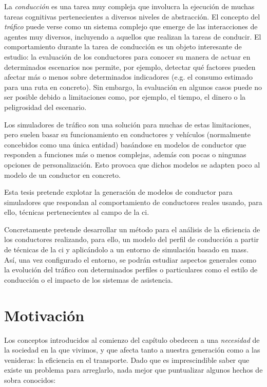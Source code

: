 La \textit{conducción} es una tarea muy compleja que involucra la ejecución de muchas tareas cognitivas pertenecientes a diversos niveles de abstracción. El concepto del \textit{tráfico} puede verse como un sistema complejo que emerge de las interacciones de agentes muy diversos, incluyendo a aquellos que realizan la tareas de conducir. El comportamiento durante la tarea de conducción es un objeto interesante de estudio: la evaluación de los conductores para conocer su manera de actuar en determinados escenarios nos permite, por ejemplo, detectar qué factores pueden afectar más o menos sobre determinados indicadores (e.g. el consumo estimado para una ruta en concreto). Sin embargo, la evaluación en algunos casos puede no ser posible debido a limitaciones como, por ejemplo, el tiempo, el dinero o la peligrosidad del escenario.

Los simuladores de tráfico son una solución para muchas de estas limitaciones, pero suelen basar su funcionamiento en conductores y vehículos (normalmente concebidos como una única entidad) basándose en modelos de conductor que responden a funciones más o menos complejas, además con pocas o ningunas opciones de personalización. Esto provoca que dichos modelos se adapten poco al modelo de un conductor en concreto.

Esta tesis pretende explotar la generación de modelos de conductor para simuladores que respondan al comportamiento de conductores reales usando, para ello, técnicas pertenecientes al campo de la \gls{ci}.

Concretamente pretende desarrollar un método para el análisis de la eficiencia de los conductores realizando, para ello, un modelo del perfil de conducción a partir de técnicas de la \gls{ci} y aplicándolo a un entorno de simulación basado en \glspl{mas}. Así, una vez configurado el entorno, se podrán estudiar aspectos generales como la evolución del tráfico con determinados perfiles o particulares como el estilo de conducción o el impacto de los sistemas de asistencia.

\section{Motivación}

Los conceptos introducidos al comienzo del capítulo obedecen a una \textit{necesidad} de la sociedad en la que vivimos, y que afecta tanto a nuestra generación como a las venideras: la eficiencia en el transporte. Dado que es imprescindible saber que existe un problema para arreglarlo, nada mejor que puntualizar algunos hechos de sobra conocidos:

